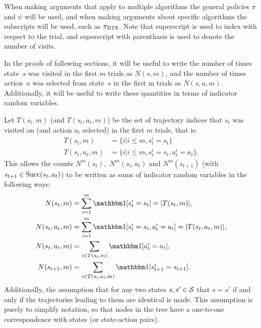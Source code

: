     When making arguments that apply to multiple algorithms the general policies $\pi$ and $\psi$ will be used, and when making arguments about specific algorithms the subscripts will be used, such as ${\pi_{{\textnormal{BTS}}}}$. Note that superscript is used to index with respect to the trial, and superscript with parenthasis is used to denote the number of visits.

    In the proofs of following sections, it will be useful to write the number of times state~$s$ was visited in the first $m$ trials as $N(s,m)$, and the number of times action~$a$ was selected from state~$s$ in the first m trials as $N(s,a,m).$ Additionally, it will be useful to write these quantities in terms of indicator random variables. 
    
    Let $T(s_t,m)$ (and $T(s_t,a_t,m)$) be the set of trajectory indices that $s_t$ was visited on (and action $a_t$ selected) in the first $m$ trials, that is: 
    \begin{align}
        T(s_t,m) &= \{i | i\leq m, s^i_t = s_t \} \\
        T(s_t,a_t,m) &= \{i | i\leq m, s^i_t = s_t, a^i_t = a_t \}.
    \end{align}
    This allows the counts $N^m(s_t),$ $N^m(s_t,a_t)$ and $N^m(s_{t+1})$ (with $s_{t+1}\in{\textnormal{Succ}(s_t,a_t)}$) to be written as sums of indicator random variables in the following ways:
    \begin{align}
        N(s_t,m) &= \sum_{i=1}^m \one[s^i_t=s_t] = |T(s_t,m)|, \\
        N(s_t,a_t,m) &= \sum_{i=1}^m \one[s^i_t=s_t,a^i_t=a_t] = |T(s_t,a_t,m)|, \\ 
        N(s_t,a_t,m) &= \sum_{i\in T(s_t,m)} \one[a^i_t = a_t], \label{appeq:nsa_sum} \\
        N(s_{t+1},m) &= \sum_{i\in T(s_t,a_t,m)} \one[s^i_{t+1} = s_{t+1}]. \label{appeq:ns_sum}
    \end{align}
    Additionally, the assumption that for any two states $s,s'\in\mathcal{S}$  that $s=s'$ if and only if the trajectories leading to them are identical is made. This assumption is purely to simplify notation, so that nodes in the tree have a one-to-one correspondence with states (or state-action pairs). 
        
        
        
        

